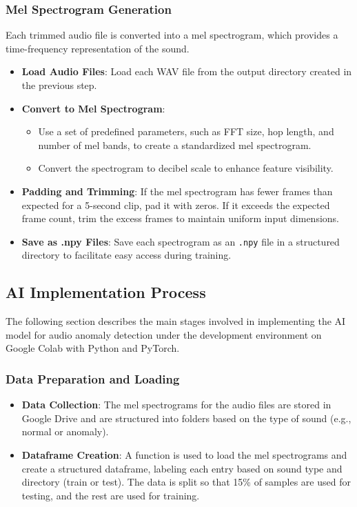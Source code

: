 \documentclass[conference]{IEEEtran}
\begin{document}
\subsubsection{Mel Spectrogram Generation}
Each trimmed audio file is converted into a mel spectrogram, which provides a time-frequency representation of the sound.

\begin{itemize}
    \item \textbf{Load Audio Files}: Load each WAV file from the output directory created in the previous step.
    \item \textbf{Convert to Mel Spectrogram}:
        \begin{itemize}
            \item Use a set of predefined parameters, such as FFT size, hop length, and number of mel bands, to create a standardized mel spectrogram.
            \item Convert the spectrogram to decibel scale to enhance feature visibility.
        \end{itemize}
    \item \textbf{Padding and Trimming}: If the mel spectrogram has fewer frames than expected for a 5-second clip, pad it with zeros. If it exceeds the expected frame count, trim the excess frames to maintain uniform input dimensions.
    \item \textbf{Save as .npy Files}: Save each spectrogram as an \texttt{.npy} file in a structured directory to facilitate easy access during training.
\end{itemize}

\subsection{AI Implementation Process}
The following section describes the main stages involved in implementing the AI model for audio anomaly detection under the development environment on Google Colab with Python and PyTorch.

\subsubsection{Data Preparation and Loading}
\begin{itemize}
    \item \textbf{Data Collection}: The mel spectrograms for the audio files are stored in Google Drive and are structured into folders based on the type of sound (e.g., normal or anomaly).
    \item \textbf{Dataframe Creation}: A function is used to load the mel spectrograms and create a structured dataframe, labeling each entry based on sound type and directory (train or test). The data is split so that 15\% of samples are used for testing, and the rest are used for training.
\end{itemize}
\end{document}
